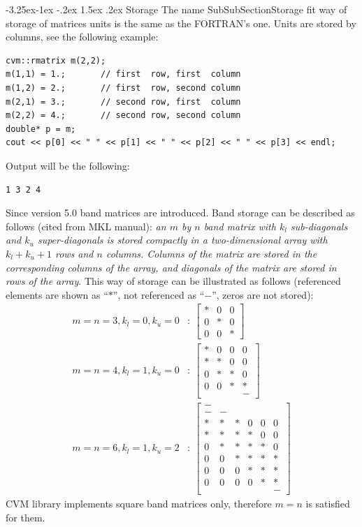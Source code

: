 \documentclass[12pt,letterpaper]{article}
\makeatletter
\newcommand{\FORTRAN}{\textsf{FORTRAN}\xspace}
\renewcommand\subsection{\@startsection{subsection}{2}{0mm}%
                                     {-3.25ex\@plus -1ex \@minus -.2ex}%
                                     {1.5ex \@plus .2ex}%
                                     {\normalfont\large\bfseries\sffamily}}
\makeatother
\begin{document}
\subsection{Storage}
The%
\pdfdest name {SubSubSectionStorage} fit{}
way of storage of matrices units is the same as the \FORTRAN's one.
Units are stored by columns, see the following example:
\begin{Verbatim}
cvm::rmatrix m(2,2);
m(1,1) = 1.;       // first  row, first  column
m(1,2) = 2.;       // first  row, second column
m(2,1) = 3.;       // second row, first  column
m(2,2) = 4.;       // second row, second column
double* p = m;
cout << p[0] << " " << p[1] << " " << p[2] << " " << p[3] << endl;
\end{Verbatim}
Output will be the following:
\begin{Verbatim}
1 3 2 4
\end{Verbatim}
Since version 5.0 band matrices are introduced. Band storage can be
described as follows (cited from MKL manual): \textit{%
an $m$ by $n$ band matrix with $k_l$ sub-diagonals and $k_u$ super-diagonals is stored
compactly in a two-dimensional array with $k_l+k_u+1$ rows and $n$ columns. Columns of the
matrix are stored in the corresponding columns of the array, and diagonals of the matrix are
stored in rows of the array}. This way of storage can be illustrated as follows
(referenced elements are shown as ``$*$'', not referenced as ``$-$'', zeros are not stored):
\begin{align*}
m=n=3, k_l=0, k_u=0&:\ \begin{bmatrix}
* & 0 & 0 \\
0 & * & 0 \\
0 & 0 & *
\end{bmatrix}\\
m=n=4, k_l=1, k_u=0&:\ \begin{bmatrix}
* & 0 & 0 & 0 \\
* & * & 0 & 0 \\
0 & * & * & 0 \\
0 & 0 & * & * \\
  &   &   & -
\end{bmatrix}\\
m=n=6, k_l=1, k_u=2&:\ \begin{bmatrix}
- &   &   &   &   &   \\
- & - &   &   &   &   \\
* & * & * & 0 & 0 & 0 \\
* & * & * & * & 0 & 0 \\
0 & * & * & * & * & 0 \\
0 & 0 & * & * & * & * \\
0 & 0 & 0 & * & * & * \\
0 & 0 & 0 & 0 & * & * \\
  &   &   &   &   & -
\end{bmatrix}
\end{align*}
CVM library implements square band matrices only,
therefore $m=n$ is satisfied for them.
\end{document}
